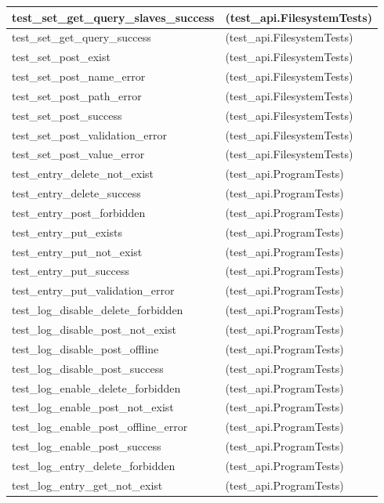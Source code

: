 \begin{longtable}{|p{10cm}|p{7cm}|}
test\_set\_get\_query\_slaves\_success & (test\_api.FilesystemTests)\\\hline
test\_set\_get\_query\_success & (test\_api.FilesystemTests)\\\hline
test\_set\_post\_exist & (test\_api.FilesystemTests)\\\hline
test\_set\_post\_name\_error & (test\_api.FilesystemTests)\\\hline
test\_set\_post\_path\_error & (test\_api.FilesystemTests)\\\hline
test\_set\_post\_success & (test\_api.FilesystemTests)\\\hline
test\_set\_post\_validation\_error & (test\_api.FilesystemTests)\\\hline
test\_set\_post\_value\_error & (test\_api.FilesystemTests)\\\hline
test\_entry\_delete\_not\_exist & (test\_api.ProgramTests)\\\hline
test\_entry\_delete\_success & (test\_api.ProgramTests)\\\hline
test\_entry\_post\_forbidden & (test\_api.ProgramTests)\\\hline
test\_entry\_put\_exists & (test\_api.ProgramTests)\\\hline
test\_entry\_put\_not\_exist & (test\_api.ProgramTests)\\\hline
test\_entry\_put\_success & (test\_api.ProgramTests)\\\hline
test\_entry\_put\_validation\_error & (test\_api.ProgramTests)\\\hline
test\_log\_disable\_delete\_forbidden & (test\_api.ProgramTests)\\\hline
test\_log\_disable\_post\_not\_exist & (test\_api.ProgramTests)\\\hline
test\_log\_disable\_post\_offline & (test\_api.ProgramTests)\\\hline
test\_log\_disable\_post\_success & (test\_api.ProgramTests)\\\hline
test\_log\_enable\_delete\_forbidden & (test\_api.ProgramTests)\\\hline
test\_log\_enable\_post\_not\_exist & (test\_api.ProgramTests)\\\hline
test\_log\_enable\_post\_offline\_error & (test\_api.ProgramTests)\\\hline
test\_log\_enable\_post\_success & (test\_api.ProgramTests)\\\hline
test\_log\_entry\_delete\_forbidden & (test\_api.ProgramTests)\\\hline
test\_log\_entry\_get\_not\_exist & (test\_api.ProgramTests)\\\hline

\end{longtable}
